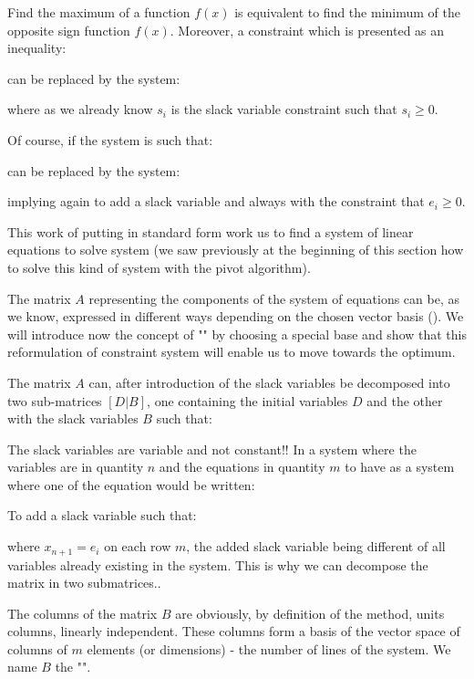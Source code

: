 	Find the maximum of a function $f (x)$ is equivalent to find the minimum of the opposite sign function $f (x)$. Moreover, a constraint which is presented as an inequality:
	
	can be replaced by the system:
	
	where as we already know $s_i$ is the slack variable constraint such that $s_i\geq 0$.
	
	Of course, if the system is such that:
	
	can be replaced by the system:
	
	implying again to add a slack variable  and always with the constraint that $e_i\geq 0$.

	This work of putting in standard form work us to find a system of linear equations to solve system (we saw previously at the beginning of this section how to solve this kind of system with the pivot algorithm).

	The matrix $A$ representing the components of the system of equations can be, as we know, expressed in different ways depending on the chosen vector basis (). We will introduce now the concept of "" by choosing a special base and show that this reformulation of constraint system will enable us to move towards the optimum.
	
	The matrix $A$ can, after introduction of the slack variables be decomposed into two sub-matrices $[D|B]$, one containing the initial variables $D$ and the other with the slack variables $B$ such that:
	
	\begin{tcolorbox}[title=Remark,colframe=black,arc=10pt]
	The slack variables are variable and not constant!! In a system where the variables are in quantity $n$ and the equations in quantity $m$ to have as a system where one of the equation would be written:
	
	To add a slack variable such that:
	
	where $x_{n+1}=e_i$ on each row $m$, the added slack variable being different of all variables already existing in the system. This is why we can decompose the matrix in two submatrices..
	\end{tcolorbox}
	The columns of the matrix $B$ are obviously, by definition of the method, units columns, linearly independent. These columns form a basis of the vector space of columns of $m$ elements (or dimensions) - the number of  lines of the system. We name $B$ the "".
	
